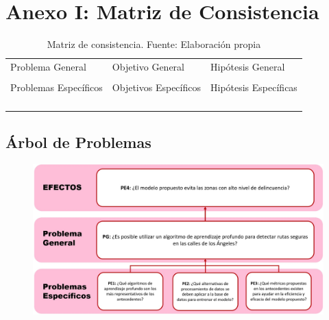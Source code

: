 \chapter{Anexo I: Matriz de Consistencia}


\begin{table}[h!]
	\centering
	\small
	\begin{tabular}{ |m{5cm}|m{5cm}|m{5cm}|  }
		\hline
		\rowcolor{bluejean}
		\Centering \color{white}{PROBLEMAS}& \Centering \color{white}{OBJETIVOS}& \Centering \color{white}{HIPÓTESIS}\\
		\hline
		\rowcolor{turq}
		\Centering Problema General& \Centering Objetivo General & \Centering Hipótesis General \\
		\hline
		{\ProblemaGeneral} & { \ObjetivoGeneral} & {\HipotesisGeneral} \\
		\hline
		\rowcolor{turq}
		\Centering Problemas Específicos& \Centering Objetivos Específicos & \Centering Hipótesis Específicas \\
		\hline
		{\Pbone} & {\Objone} & {\Hone} \\
		\hline
		{\Pbtwo} & {\Objtwo} & {\Htwo} \\
		\hline
		{\Pbthree} & {\Objthree} & {\Hthree} \\
		\hline
		{\Pbfour} & {\Objfour} & {\Hfour} \\
		\hline
	\end{tabular}
	\caption{Matriz de consistencia. Fuente: Elaboración propia}
	\label{1:table}
\end{table}

\section{Árbol de Problemas}
	\label{anexo1}
	\begin{figure}[h]
		\begin{center}
			\includegraphics[width=1.05\textwidth]{anexos/PROBLEMAS.jpg}
		\end{center}
	\end{figure}
	\clearpage
	
